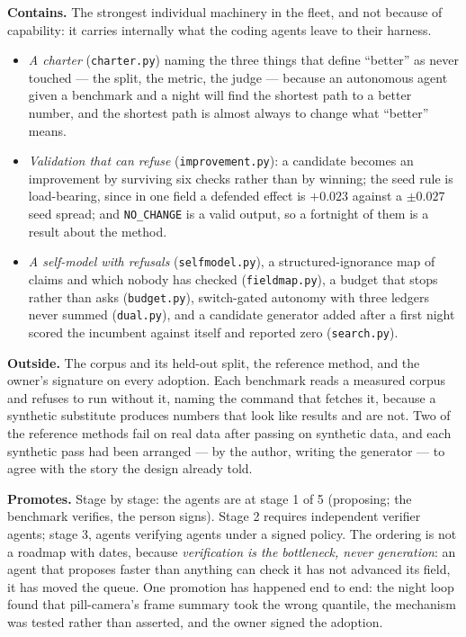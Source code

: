 \documentclass[11pt]{article}
\theoremstyle{definition}
\begin{document}
\textbf{Contains.} The strongest individual machinery in the fleet, and not because of capability: it carries internally what the coding agents leave to their harness.
\begin{itemize}[leftmargin=*]
\item \emph{A charter} (\texttt{charter.py}) naming the three things that define ``better'' as never touched --- the split, the metric, the judge --- because an autonomous agent given a benchmark and a night will find the shortest path to a better number, and the shortest path is almost always to change what ``better'' means.
\item \emph{Validation that can refuse} (\texttt{improvement.py}): a candidate becomes an improvement by surviving six checks rather than by winning; the seed rule is load-bearing, since in one field a defended effect is $+0.023$ against a $\pm0.027$ seed spread; and \texttt{NO\_CHANGE} is a valid output, so a fortnight of them is a result about the method.
\item \emph{A self-model with refusals} (\texttt{selfmodel.py}), a structured-ignorance map of claims and which nobody has checked (\texttt{fieldmap.py}), a budget that stops rather than asks (\texttt{budget.py}), switch-gated autonomy with three ledgers never summed (\texttt{dual.py}), and a candidate generator added after a first night scored the incumbent against itself and reported zero (\texttt{search.py}).
\end{itemize}

\textbf{Outside.} The corpus and its held-out split, the reference method, and the owner's signature on every adoption. Each benchmark reads a measured corpus and refuses to run without it, naming the command that fetches it, because a synthetic substitute produces numbers that look like results and are not. Two of the reference methods fail on real data after passing on synthetic data, and each synthetic pass had been arranged --- by the author, writing the generator --- to agree with the story the design already told.

\textbf{Promotes.} Stage by stage: the agents are at stage 1 of 5 (proposing; the benchmark verifies, the person signs). Stage 2 requires independent verifier agents; stage 3, agents verifying agents under a signed policy. The ordering is not a roadmap with dates, because \emph{verification is the bottleneck, never generation}: an agent that proposes faster than anything can check it has not advanced its field, it has moved the queue. One promotion has happened end to end: the night loop found that pill-camera's frame summary took the wrong quantile, the mechanism was tested rather than asserted, and the owner signed the adoption.
\end{document}
